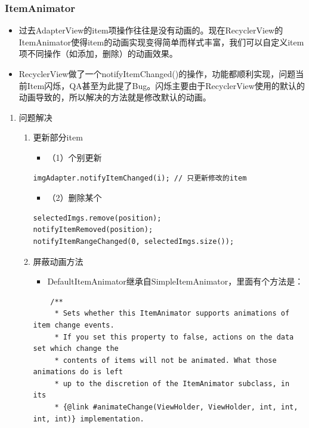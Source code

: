 \documentclass[9pt, b5paper]{article}
\begin{document}
\subsubsection{ItemAnimator}
\label{sec-5-3-5}
\begin{itemize}
\item 过去AdapterView的item项操作往往是没有动画的。现在RecyclerView的ItemAnimator使得item的动画实现变得简单而样式丰富，我们可以自定义item项不同操作（如添加，删除）的动画效果。
\item RecyclerView做了一个notifyItemChanged()的操作，功能都顺利实现，问题当前Item闪烁，QA甚至为此提了Bug。闪烁主要由于RecyclerView使用的默认的动画导致的，所以解决的方法就是修改默认的动画。
\end{itemize}
\begin{enumerate}
\item 问题解决
\label{sec-5-3-5-1}
\begin{enumerate}
\item 更新部分item
\label{sec-5-3-5-1-1}
\begin{itemize}
\item （1）个别更新
\end{itemize}
\begin{verbatim}
imgAdapter.notifyItemChanged(i); // 只更新修改的item
\end{verbatim}
\begin{itemize}
\item （2）删除某个
\end{itemize}
\begin{verbatim}
selectedImgs.remove(position);
notifyItemRemoved(position);
notifyItemRangeChanged(0, selectedImgs.size());
\end{verbatim}
\item 屏蔽动画方法
\label{sec-5-3-5-1-2}
\begin{itemize}
\item DefaultItemAnimator继承自SimpleItemAnimator，里面有个方法是：
\end{itemize}
\begin{verbatim}
    /**
     * Sets whether this ItemAnimator supports animations of item change events.
     * If you set this property to false, actions on the data set which change the
     * contents of items will not be animated. What those animations do is left
     * up to the discretion of the ItemAnimator subclass, in its
     * {@link #animateChange(ViewHolder, ViewHolder, int, int, int, int)} implementation.

\end{verbatim}
\end{enumerate}
\end{enumerate}
\end{document}
